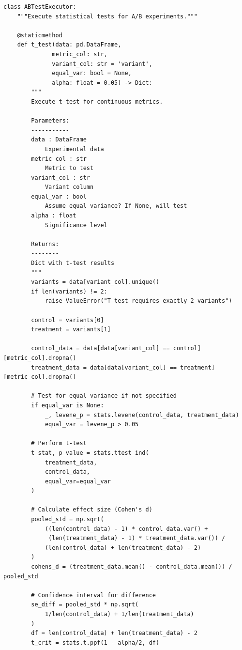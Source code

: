 \lstset{language=Python, caption=Automated Test Execution}
\begin{lstlisting}
class ABTestExecutor:
    """Execute statistical tests for A/B experiments."""

    @staticmethod
    def t_test(data: pd.DataFrame,
              metric_col: str,
              variant_col: str = 'variant',
              equal_var: bool = None,
              alpha: float = 0.05) -> Dict:
        """
        Execute t-test for continuous metrics.

        Parameters:
        -----------
        data : DataFrame
            Experimental data
        metric_col : str
            Metric to test
        variant_col : str
            Variant column
        equal_var : bool
            Assume equal variance? If None, will test
        alpha : float
            Significance level

        Returns:
        --------
        Dict with t-test results
        """
        variants = data[variant_col].unique()
        if len(variants) != 2:
            raise ValueError("T-test requires exactly 2 variants")

        control = variants[0]
        treatment = variants[1]

        control_data = data[data[variant_col] == control][metric_col].dropna()
        treatment_data = data[data[variant_col] == treatment][metric_col].dropna()

        # Test for equal variance if not specified
        if equal_var is None:
            _, levene_p = stats.levene(control_data, treatment_data)
            equal_var = levene_p > 0.05

        # Perform t-test
        t_stat, p_value = stats.ttest_ind(
            treatment_data,
            control_data,
            equal_var=equal_var
        )

        # Calculate effect size (Cohen's d)
        pooled_std = np.sqrt(
            ((len(control_data) - 1) * control_data.var() +
             (len(treatment_data) - 1) * treatment_data.var()) /
            (len(control_data) + len(treatment_data) - 2)
        )
        cohens_d = (treatment_data.mean() - control_data.mean()) / pooled_std

        # Confidence interval for difference
        se_diff = pooled_std * np.sqrt(
            1/len(control_data) + 1/len(treatment_data)
        )
        df = len(control_data) + len(treatment_data) - 2
        t_crit = stats.t.ppf(1 - alpha/2, df)


\end{lstlisting}
